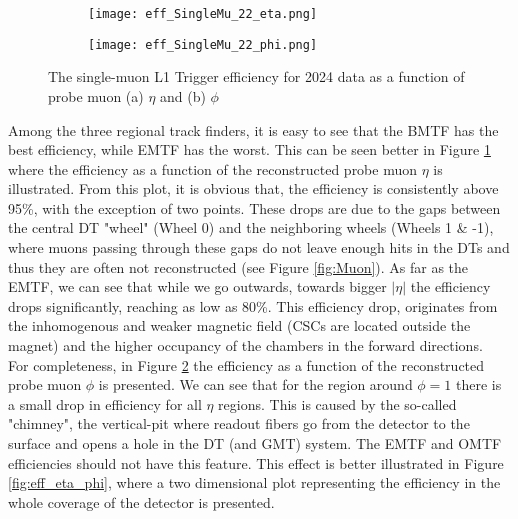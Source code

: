 \begin{figure}[H]
    \centering
    \begin{subfigure}{0.48\textwidth}
        \texttt{[image: eff\_SingleMu\_22\_eta.png]}
        \caption{}
        \label{subfig:eff_eta}
    \end{subfigure}
    \begin{subfigure}{0.48\textwidth}
        \texttt{[image: eff\_SingleMu\_22\_phi.png]}
        \caption{}
        \label{subfig:eff_phi}        
    \end{subfigure} 
    \caption{The single-muon L1 Trigger efficiency for 2024 data as a function of probe muon (a) $\eta$ and (b) $\phi$}
    \label{fig:eff_eta&phi}
\end{figure}

Among the three regional track finders, it is easy to see that the BMTF has the best efficiency, while EMTF has the worst. This can be seen better in Figure \ref{subfig:eff_eta} where the efficiency as a function of the reconstructed probe muon $\eta$ is illustrated. From this plot, it is obvious that, the efficiency is consistently above 95\%, with the exception of two points. These drops are due to the gaps between the central DT "wheel" (Wheel 0) and the neighboring wheels (Wheels 1 \& -1), where muons passing through these gaps do not leave enough hits in the DTs and thus they are often not reconstructed (see Figure \ref{fig:Muon}).
As far as the EMTF, we can see that while we go outwards, towards bigger $|\eta|$ the efficiency drops significantly, reaching as low as 80\%. This efficiency drop, originates from the inhomogenous and weaker magnetic field (CSCs are located outside the magnet) and the higher occupancy of the chambers in the forward directions.\\
\indent For completeness, in Figure \ref{subfig:eff_phi} the efficiency as a function of the reconstructed probe muon $\phi$ is presented. We can see that for the region around $\phi = 1$ there is a small drop in efficiency for all $\eta$ regions. This is caused by the so-called "chimney", the vertical-pit where readout fibers go from the detector to the surface and opens a hole in the DT (and GMT) system. The EMTF and OMTF efficiencies should not have this feature. This effect is better illustrated in Figure \ref{fig:eff_eta_phi}, where a two dimensional plot representing the efficiency in the whole coverage of the detector is presented.
